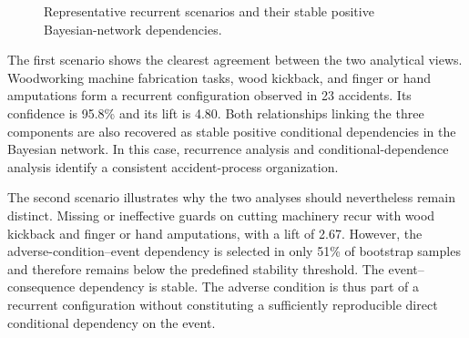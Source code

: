 \begin{figure}[!htbp]

\caption{
Representative recurrent scenarios and their stable positive
Bayesian-network dependencies.
}
\label{fig:chap4_carpentry_representative_scenarios}
\end{figure}

The first scenario shows the clearest agreement between the two analytical
views. Woodworking machine fabrication tasks, wood kickback, and finger or
hand amputations form a recurrent configuration observed in 23 accidents.
Its confidence is 95.8\% and its lift is 4.80. Both relationships linking the
three components are also recovered as stable positive conditional
dependencies in the Bayesian network. In this case, recurrence analysis and
conditional-dependence analysis identify a consistent accident-process
organization.

The second scenario illustrates why the two analyses should nevertheless
remain distinct. Missing or ineffective guards on cutting machinery recur
with wood kickback and finger or hand amputations, with a lift of 2.67.
However, the adverse-condition--event dependency is selected in only 51\% of
bootstrap samples and therefore remains below the predefined stability
threshold. The event--consequence dependency is stable. The adverse condition
is thus part of a recurrent configuration without constituting a sufficiently
reproducible direct conditional dependency on the event.

